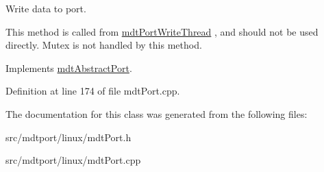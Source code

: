 Write data to port. 

This method is called from \hyperlink{classmdt_port_write_thread}{mdtPortWriteThread} , and should not be used directly. Mutex is not handled by this method. 

Implements \hyperlink{classmdt_abstract_port_a64d4802975a76474b9196c91f57a6d90}{mdtAbstractPort}.



Definition at line 174 of file mdtPort.cpp.



The documentation for this class was generated from the following files:\begin{DoxyCompactItemize}
\item 
src/mdtport/linux/mdtPort.h\item 
src/mdtport/linux/mdtPort.cpp\end{DoxyCompactItemize}
